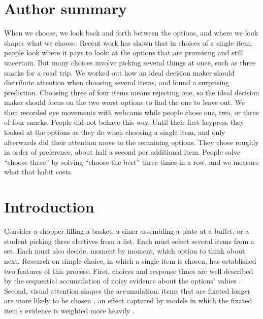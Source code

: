 \documentclass[10pt,letterpaper]{article}
\begin{document}
\section*{Author summary}\label{author-summary}

When we choose, we look back and forth between the options, and where we
look shapes what we choose. Recent work has shown that in choices of a
single item, people look where it pays to look: at the options that are
promising and still uncertain. But many choices involve picking several
things at once, such as three snacks for a road trip. We worked out how
an ideal decision maker should distribute attention when choosing
several items, and found a surprising prediction. Choosing three of four
items means rejecting one, so the ideal decision maker should focus on
the two worst options to find the one to leave out. We then recorded eye
movements with webcams while people chose one, two, or three of four
snacks. People did not behave this way. Until their first keypress they
looked at the options as they do when choosing a single item, and only
afterwards did their attention move to the remaining options. They chose
roughly in order of preference, about half a second per additional item.
People solve ``choose three'' by solving ``choose the best'' three times
in a row, and we measure what that habit costs.

\clearpage
{}
\linenumbers
\section*{Introduction}\label{introduction}

Consider a shopper filling a basket, a diner assembling a plate at a
buffet, or a student picking three electives from a list. Each must
select several items from a set. Each must also decide, moment by
moment, which option to think about next. Research on simple choice, in
which a single item is chosen, has established two features of this
process. First, choices and response times are well described by the
sequential accumulation of noisy evidence about the options' values
\cite{ratcliff2008,usher2001,milosavljevic2010,busemeyer1993}. Second,
visual attention shapes the accumulation: items that are fixated longer
are more likely to be chosen
\cite{shimojo2003,krajbich2010,krajbich2011,armel2008,smith2019,bhatnagar2022},
an effect captured by models in which the fixated item's evidence is
weighted more heavily
\cite{krajbich2010,krajbich2011,thomas2019,krajbich2019,ting2024}.
\end{document}
